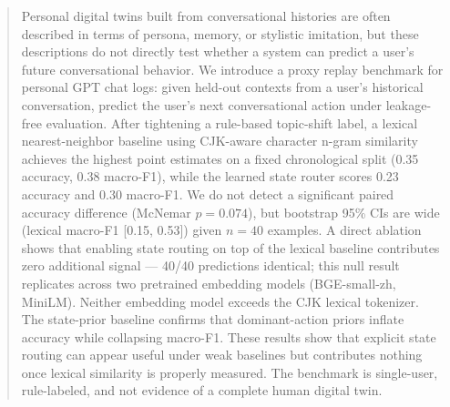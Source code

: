 \begin{abstract}
Personal digital twins built from conversational histories are often described in terms of persona, memory, or stylistic imitation, but these descriptions do not directly test whether a system can predict a user's future conversational behavior. We introduce a proxy replay benchmark for personal GPT chat logs: given held-out contexts from a user's historical conversation, predict the user's next conversational action under leakage-free evaluation. After tightening a rule-based topic-shift label, a lexical nearest-neighbor baseline using CJK-aware character n-gram similarity achieves the highest point estimates on a fixed chronological split (0.35 accuracy, 0.38 macro-F1), while the learned state router scores 0.23 accuracy and 0.30 macro-F1. We do not detect a significant paired accuracy difference (McNemar $p=0.074$), but bootstrap 95\% CIs are wide (lexical macro-F1 [0.15, 0.53]) given $n=40$ examples. A direct ablation shows that enabling state routing on top of the lexical baseline contributes zero additional signal — 40/40 predictions identical; this null result replicates across two pretrained embedding models (BGE-small-zh, MiniLM). Neither embedding model exceeds the CJK lexical tokenizer. The state-prior baseline confirms that dominant-action priors inflate accuracy while collapsing macro-F1. These results show that explicit state routing can appear useful under weak baselines but contributes nothing once lexical similarity is properly measured. The benchmark is single-user, rule-labeled, and not evidence of a complete human digital twin.
\end{abstract}
